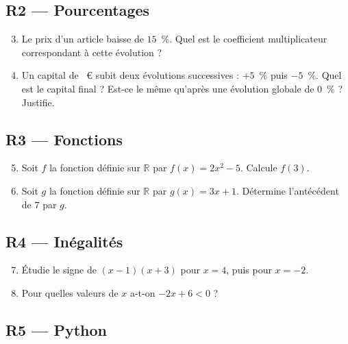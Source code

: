 \subsection*{R2 — Pourcentages}

\begin{enumerate}
  \setcounter{enumi}{2}

  \item Le prix d'un article baisse de $15$~\%. Quel est le coefficient multiplicateur correspondant à cette évolution ?

  \item Un capital de ~€ subit deux évolutions successives : $+5$~\% puis $-5$~\%. Quel est le capital final ? Est-ce le même qu'après une évolution globale de $0$~\% ? Justifie.

\end{enumerate}

\subsection*{R3 — Fonctions}

\begin{enumerate}
  \setcounter{enumi}{4}

  \item Soit $f$ la fonction définie sur $\mathbb{R}$ par $f(x) = 2x^2 - 5$. Calcule $f(3)$.

  \item Soit $g$ la fonction définie sur $\mathbb{R}$ par $g(x) = 3x + 1$. Détermine l'antécédent de $7$ par $g$.

\end{enumerate}

\subsection*{R4 — Inégalités}

\begin{enumerate}
  \setcounter{enumi}{6}

  \item Étudie le signe de $(x - 1)(x + 3)$ pour $x = 4$, puis pour $x = -2$.

  \item Pour quelles valeurs de $x$ a-t-on $-2x + 6 < 0$ ?

\end{enumerate}

\subsection*{R5 — Python}


